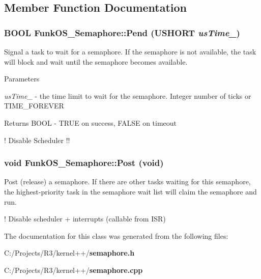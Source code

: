 \subsection{Member Function Documentation}
\subsubsection[{Pend}]{\setlength{\rightskip}{0pt plus 5cm}BOOL FunkOS\_\-Semaphore::Pend (USHORT {\em usTime\_\-})}\label{class_funk_o_s___semaphore_a3e2ec8d17cc710c255f37b2c59467dfd}
Signal a task to wait for a semaphore. If the semaphore is not available, the task will block and wait until the semaphore becomes available.


\begin{DoxyParams}{Parameters}
\item[{\em usTime\_\-}]-\/ the time limit to wait for the semaphore. Integer number of ticks or TIME\_\-FOREVER \end{DoxyParams}
\begin{DoxyReturn}{Returns}
BOOL -\/ TRUE on success, FALSE on timeout 
\end{DoxyReturn}


! Disable Scheduler !! 
\subsubsection[{Post}]{\setlength{\rightskip}{0pt plus 5cm}void FunkOS\_\-Semaphore::Post (void)}\label{class_funk_o_s___semaphore_a8b6b920849aa2d19130a16ffebef5c8b}
Post (release) a semaphore. If there are other tasks waiting for this semaphore, the highest-\/priority task in the semaphore wait list will claim the semaphore and run. 

! Disable scheduler + interrupts (callable from ISR) 

The documentation for this class was generated from the following files:\begin{DoxyCompactItemize}
\item 
C:/Projects/R3/kernel++/{\bf semaphore.h}\item 
C:/Projects/R3/kernel++/{\bf semaphore.cpp}\end{DoxyCompactItemize}
